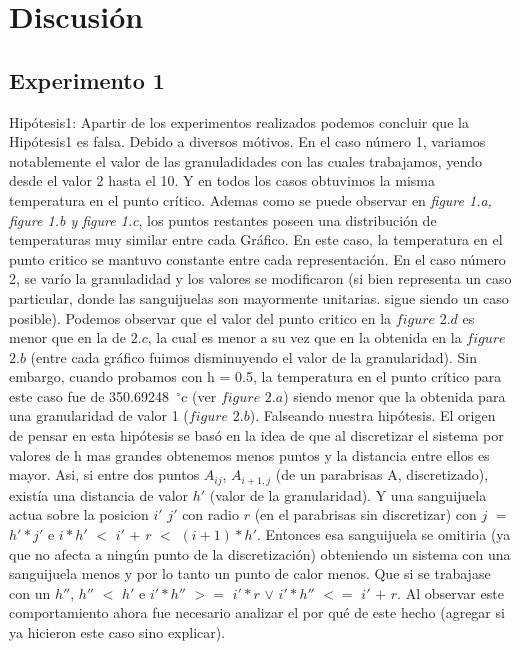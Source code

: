\section{Discusión}


\subsection{Experimento 1}
Hipótesis1: Apartir de los experimentos realizados podemos concluir que la Hipótesis1 es falsa. Debido a diversos mótivos. En el caso número 1, variamos notablemente el valor de las granuladidades con las cuales trabajamos, yendo desde el valor 2 hasta el 10. Y en todos los casos obtuvimos la misma temperatura en el punto crítico. Ademas como se puede observar en \textit{figure 1.a, figure 1.b y figure 1.c}, los puntos restantes poseen una distribución de temperaturas muy similar entre cada Gráfico. En este caso, la temperatura en el punto critico se mantuvo constante entre cada representación.
En el caso número 2, se varío la granuladidad y los valores se modificaron (si bien representa un caso particular, donde las sanguijuelas son mayormente unitarias. sigue siendo un caso posible). Podemos observar que el valor del punto critico en la $figure$ $2.d$ es menor que en la de $2.c$, la cual es menor a su vez que en la obtenida en la $figure$ $2.b$  (entre cada gráfico fuimos disminuyendo el valor de la granularidad). Sin embargo, cuando probamos con h = 0.5, la temperatura en el punto crítico para este caso fue de 350.69248\hspace{-1.5mm}$\phantom{a}^{\circ}$c (ver $figure$ $2.a$) siendo menor que la obtenida para una granularidad de valor 1 ($figure$ $2.b$). Falseando nuestra hipótesis. \newline
El origen de pensar en esta hipótesis se basó en la idea de que al discretizar el sistema por valores de h mas grandes obtenemos menos puntos y la distancia entre ellos es mayor. Asi, si entre dos puntos $A_{ij}$, $A_{i+1,j}$ (de un parabrisas A, discretizado), existía una distancia de valor $h'$ (valor de la granularidad). Y una sanguijuela actua sobre la posicion $i'$ $j'$ con radio $r$ (en el parabrisas sin discretizar) con $j$ $=$ $h'*j'$ e $i*h'$ $<$ $i'$ $+$ $r$ $<$ $(i+1)*h'$. Entonces esa sanguijuela se omitiria (ya que no afecta a ningún punto de la discretización) obteniendo un sistema con una sanguijuela menos y por lo tanto un punto de calor menos. Que si se trabajase con un $h''$, $h''$ $<$ $h'$ e $i'*h''$ $>=$ $i'*r$ $\vee$ $i'*h''$ $<=$ $i'$ $+$ $r$. Al observar este comportamiento ahora fue necesario analizar el por qué de este hecho (agregar si ya hicieron este caso sino explicar).\newline \newline


